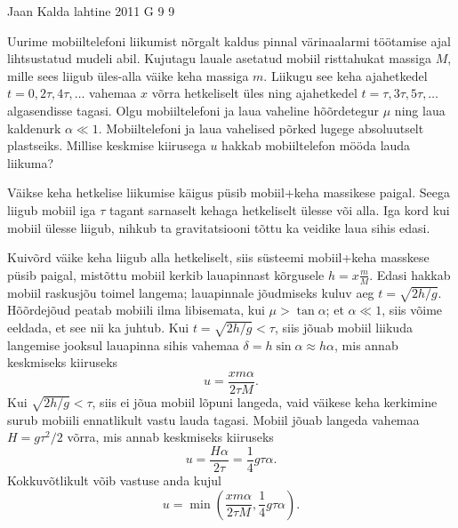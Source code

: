 {Jaan Kalda} %
{lahtine} %
{2011} %
{G 9} %
{9} %
{
\ifStatement
Uurime mobiiltelefoni liikumist nõrgalt kaldus pinnal värinaalarmi töötamise
ajal lihtsustatud mudeli abil.
Kujutagu lauale asetatud mobiil risttahukat massiga $M$, mille sees liigub
üles-alla väike keha massiga $m$.
Liikugu see keha ajahetkedel $t=0, 2\tau, 4\tau, \ldots$ vahemaa $x$ võrra
hetkeliselt üles ning ajahetkedel $t=\tau, 3\tau, 5\tau, \ldots$ algasendisse
tagasi.
Olgu mobiiltelefoni ja laua vaheline hõõrdetegur $\mu$ ning laua kaldenurk
$\alpha \ll 1$. Mobiiltelefoni ja laua vahelised põrked lugege absoluutselt
plastseiks.
Millise keskmise kiirusega $u$ hakkab mobiiltelefon mööda lauda liikuma?
\fi


\ifHint
Väikse keha hetkelise liikumise käigus püsib mobiil+keha massikese paigal. Seega liigub mobiil iga $\tau$ tagant sarnaselt kehaga hetkeliselt ülesse või alla. Iga kord kui mobiil ülesse liigub, nihkub ta gravitatsiooni tõttu ka veidike laua sihis edasi.
\fi


\ifSolution
Kuivõrd väike keha liigub alla hetkeliselt, siis süsteemi mobiil+keha masskese püsib paigal, mistõttu mobiil kerkib lauapinnast kõrgusele $h=x\frac mM$.
Edasi hakkab mobiil raskusjõu toimel langema; lauapinnale jõudmiseks kuluv aeg $t=\sqrt{2h/g}$. Hõõrdejõud peatab mobiili ilma libisemata, kui $\mu>\tan\alpha$; et
$\alpha \ll 1$, siis võime eeldada, et see nii ka juhtub. Kui $t=\sqrt{2h/g}<\tau$, siis jõuab mobiil liikuda langemise jooksul lauapinna sihis vahemaa $\delta=h\sin\alpha\approx h\alpha$,
mis annab keskmiseks kiiruseks $$u=\frac{xm\alpha}{2\tau M}.$$ Kui $\sqrt{2h/g}<\tau$, siis ei jõua mobiil lõpuni langeda, vaid väikese keha kerkimine surub mobiili ennatlikult vastu lauda tagasi.
Mobiil jõuab langeda vahemaa $H=g\tau^2/2$ võrra, mis annab keskmiseks kiiruseks
$$u=\frac{H\alpha}{2\tau}=\frac 14 g\tau\alpha.$$
Kokkuvõtlikult võib vastuse anda kujul
$$u=\min\left(\frac{xm\alpha}{2\tau M}, \frac 14 g\tau\alpha\right).$$
\fi
}